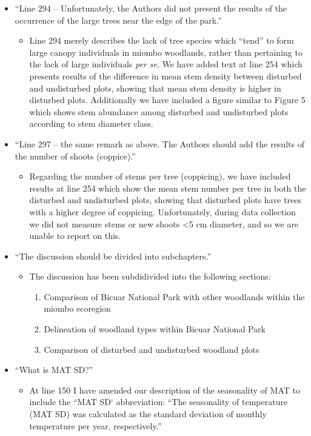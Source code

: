 \documentclass[a4paper]{letter}
\begin{document}
\begin{letter}{}
\begin{itemize}
\begin{itemize}
		\end{itemize}
	\item{``Line 294 – Unfortunately, the Authors did not present the results of the occurrence of the large trees near the edge of the park.''}
		\begin{itemize}
			\item{Line 294 merely describes the lack of tree species which ``tend'' to form large canopy individuals in miombo woodlands, rather than pertaining to the lack of large individuals \textit{per se}. We have added text at line 254 which presents results of the difference in mean stem density between disturbed and undisturbed plots, showing that mean stem density is higher in disturbed plots. Additionally we have included a figure similar to Figure 5 which shows stem abundance among disturbed and undisturbed plots according to stem diameter class.}
		\end{itemize}
	\item{``Line 297 – the same remark as above. The Authors should add the results of the number of shoots (coppice).''}
		\begin{itemize}
			\item{Regarding the number of stems per tree (coppicing), we have included results at line 254 which show the mean stem number per tree in both the disturbed and undisturbed plots, showing that disturbed plots have trees with a higher degree of coppicing. Unfortunately, during data collection we did not measure stems or new shoots \textless{}5 cm diameter, and so we are unable to report on this.}
		\end{itemize}
	\item{``The discussion should be divided into subchapters.''}
		\begin{itemize}
			\item{The discussion has been subdidivided into the following sections:}
				\begin{enumerate}
					\item{Comparison of Bicuar National Park with other woodlands within the miombo ecoregion}
					\item{Delineation of woodland types within Bicuar National Park}
					\item{Comparison of disturbed and undisturbed woodland plots}
				\end{enumerate}
		\end{itemize}
	\item{``What is MAT SD?''}
			\begin{itemize}
				\item{At line 150 I have amended our description of the seasonality of MAT to include the ``MAT SD` abbreviation: ``The seasonality of temperature (MAT SD) was calculated as the standard deviation of monthly temperature per year, respectively.''}
			\end{itemize}
\end{itemize}


\end{letter}
\end{document}

